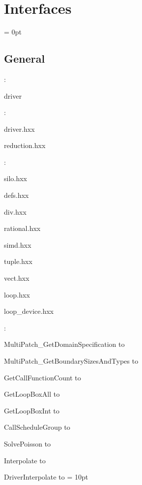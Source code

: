 
\section{Interfaces} 


\parskip = 0pt

\vspace{3mm} \subsection*{General}

: 

driver
\vspace{2mm}

\vspace{5mm}

: 



driver.hxx

reduction.hxx
\vspace{2mm}

: 

silo.hxx

defs.hxx

div.hxx

rational.hxx

simd.hxx

tuple.hxx

vect.hxx

loop.hxx

loop\_device.hxx
\vspace{2mm}

: 



MultiPatch\_GetDomainSpecification to 

MultiPatch\_GetBoundarySizesAndTypes to 

GetCallFunctionCount to 

GetLoopBoxAll to 

GetLoopBoxInt to 

CallScheduleGroup to 

SolvePoisson to 

Interpolate to 

DriverInterpolate to 
\vspace{2mm}\parskip = 10pt 

